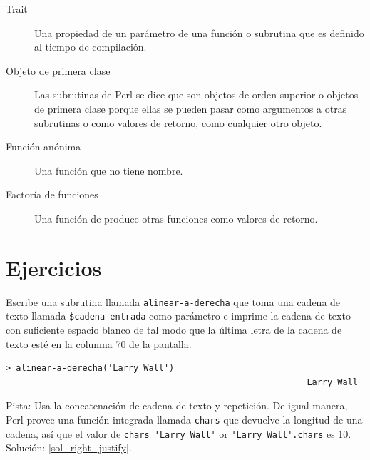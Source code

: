 \begin{description}
\item[Trait] Una propiedad de un parámetro de una función
o subrutina que es definido al tiempo de compilación.

\item[Objeto de primera clase] Las subrutinas de Perl se
dice que son objetos de orden superior o objetos de primera 
clase porque ellas se pueden pasar como argumentos a 
otras subrutinas o como valores de retorno, como cualquier
otro objeto.

\item[Función anónima] Una función que no tiene nombre.

\item[Factoría de funciones] Una función de produce otras 
funciones como valores de retorno.

\end{description}


\section{Ejercicios}

\begin{exercise}
\label{right_justify}

Escribe una subrutina llamada \verb|alinear-a-derecha| 
que toma una cadena de texto llamada {\tt \$cadena-entrada}
como parámetro e imprime la cadena de texto con suficiente
espacio blanco de tal modo que la última letra de la cadena
de texto esté en la columna 70 de la pantalla.

\begin{lstlisting}
> alinear-a-derecha('Larry Wall')
                                                           Larry Wall
\end{lstlisting}

Pista: Usa la concatenación de cadena de texto y repetición. 
De igual manera, Perl provee una función integrada llamada 
{\tt chars} que devuelve la longitud de una cadena, así que
el valor de \verb"chars 'Larry Wall'" or \verb"'Larry Wall'.chars"
es 10. Solución: \ref{sol_right_justify}.

\end{exercise}


